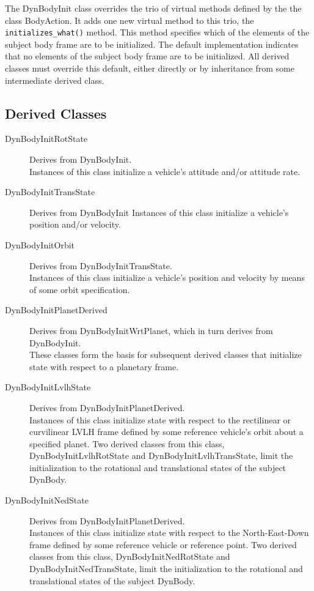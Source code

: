 The DynBodyInit class overrides the trio of virtual methods defined by the
the class BodyAction. It adds one new virtual method to this trio, the
{\tt initializes\_what()} method. This method specifies which of the elements
of the subject body frame are to be initialized. The default implementation
indicates that no elements of the subject body frame are to be initialized.
All derived classes must override this default, either directly or
by inheritance from some intermediate derived class.

\subsection{Derived Classes}
\begin{description}
\item[DynBodyInitRotState] Derives from DynBodyInit. \\
Instances of this class initialize a vehicle's attitude
and/or attitude rate.
\item[DynBodyInitTransState] Derives from DynBodyInit
Instances of this class initialize a vehicle's position
and/or velocity.
\item[DynBodyInitOrbit] Derives from DynBodyInitTransState. \\
Instances of this class initialize a vehicle's position
and velocity by means of some orbit specification.
\item[DynBodyInitPlanetDerived] Derives from DynBodyInitWrtPlanet,
which in turn derives from DynBodyInit. \\
These classes form the basis for subsequent derived classes that
initialize state with respect to a planetary frame.
\item[DynBodyInitLvlhState] Derives from DynBodyInitPlanetDerived. \\
Instances of this class initialize state with respect to the
rectilinear or curvilinear LVLH frame defined by some reference
vehicle's orbit about a specified planet.
Two derived classes from this class,
DynBodyInitLvlhRotState and DynBodyInitLvlhTransState,
limit the initialization to the rotational and translational
states of the subject DynBody.
\item[DynBodyInitNedState] Derives from DynBodyInitPlanetDerived. \\
Instances of this class initialize state with respect to the
North-East-Down frame defined by some reference vehicle or
reference point.
Two derived classes from this class,
DynBodyInitNedRotState and DynBodyInitNedTransState,
limit the initialization to the rotational and translational
states of the subject DynBody.
\end{description}
